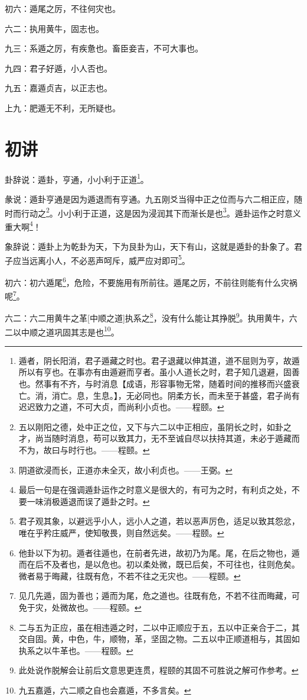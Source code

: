 \documentclass[12pt,oneside]{book}
\begin{document}
初六：遁尾之厉，不往何灾也。

六二：执用黄牛，固志也。

九三：系遁之厉，有疾惫也。畜臣妾吉，不可大事也。

九四：君子好遁，小人否也。

九五：嘉遁贞吉，以正志也。

上九：肥遁无不利，无所疑也。

\section{初讲}
卦辞说：遁卦，亨通，小小利于正道\footnote{遁者，阴长阳消，君子遁藏之时也。君子退藏以伸其道，道不屈则为亨，故遁所以有亨也。在事亦有由遁避而亨者。虽小人道长之时，君子知几退避，固善也。然事有不齐，与时消息【成语，形容事物无常，随着时间的推移而兴盛衰亡。消，消亡。息，生息。】，无必同也。阴柔方长，而未至于甚盛，君子尚有迟迟致力之道，不可大贞，而尚利小贞也。——程颐。}。

彖说：遁卦亨通是因为遁退而有亨通。九五刚爻当得中正之位而与六二相正应，随时而行动之\footnote{五以刚阳之德，处中正之位，又下与六二以中正相应，虽阴长之时，如卦之才，尚当随时消息，苟可以致其力，无不至诚自尽以扶持其道，未必于遁藏而不为，故曰与时行也。——程颐。}。小小利于正道，这是因为浸润其下而渐长是也\footnote{阴道欲浸而长，正道亦未全灭，故小利贞也。——王弼。}。遁卦运作之时意义重大啊\footnote{最后一句是在强调遁卦运作之时意义是很大的，有可为之时，有利贞之处，不要一味消极遁退而误了遁卦之时。}！

象辞说：遁卦上为乾卦为天，下为艮卦为山，天下有山，这就是遁卦的卦象了。君子应当远离小人，不必恶声呵斥，威严应对即可\footnote{君子观其象，以避远乎小人，远小人之道，若以恶声厉色，适足以致其怨忿，唯在乎矜庄威严，使知敬畏，则自然远矣。——程颐。}。

初六：初六遁尾\footnote{他卦以下为初。遁者往遁也，在前者先进，故初乃为尾。尾，在后之物也，遁而在后不及者也，是以危也。初以柔处微，既已后矣，不可往也，往则危矣。微者易于晦藏，往既有危，不若不往之无灾也。——程颐。}，危险，不要施用有所前往。遁尾之厉，不前往则能有什么灾祸呢\footnote{见几先遁，固为善也；遁而为尾，危之道也。往既有危，不若不往而晦藏，可免于灾，处微故也。——程颐。}。

六二：六二用黄牛之革[中顺之道]执系之\footnote{二与五为正应，虽在相违遁之时，二以中正顺应于五，五以中正亲合于二，其交自固。黄，中色，牛，顺物，革，坚固之物。二五以中正顺道相与，其固如执系之以牛革也。——程颐。}，没有什么能让其挣脱\footnote{此处说作脱解会让前后文意思更连贯，程颐的其固不可胜说之解可作参考。}。执用黄牛，六二以中顺之道巩固其志是也\footnote{九五嘉遁，六二顺之自也会嘉遁，不多言矣。}。
\end{document}
